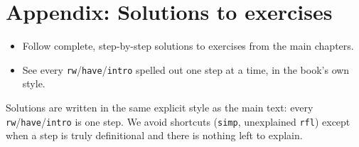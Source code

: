 \chapter*{Appendix: Solutions to exercises}
\setcounter{section}{0}\label{sec:14-appendix-solutions:00-index:1}

\begin{learningobjectives}
\begin{itemize}
\tightlist
\item
  Follow complete, step-by-step solutions to exercises from the main chapters.
\item
  See every \texttt{rw}/\texttt{have}/\texttt{intro} spelled out one step at a time, in the book's own style.
\end{itemize}
\end{learningobjectives}


Solutions are written in the same explicit style as the main text: every \texttt{rw}/\texttt{have}/\texttt{intro} is one step. We avoid shortcuts (\texttt{simp}, unexplained \texttt{rfl}) except when a step is truly definitional and there is nothing left to explain.












